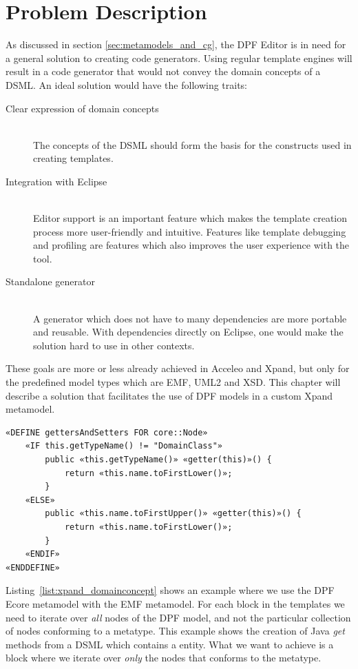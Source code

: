 \section{Problem Description}\label{sec:problem_description}
As discussed in section \ref{sec:metamodels_and_cg}, the DPF Editor is in need for a general solution to creating code generators. Using regular template engines will result in a code generator that would not convey the domain concepts of a DSML. An ideal solution would have the following traits:
\begin{description}
  \item[Clear expression of domain concepts] \hfill \\
  The concepts of the DSML should form the basis for the constructs used in creating templates.
  \item[Integration with Eclipse] \hfill \\
  Editor support is an important feature which makes the template creation process more user-friendly and intuitive. Features like template debugging and profiling are features which also improves the user experience with the tool.
  \item[Standalone generator] \hfill \\
  A generator which does not have to many dependencies are more portable and reusable. With dependencies directly on Eclipse, one would make the solution hard to use in other contexts.
\end{description}

These goals are more or less already achieved in Acceleo and Xpand, but only for the predefined model types which are EMF, UML2 and XSD. This chapter will describe a solution that facilitates the use of DPF models in a custom Xpand metamodel.

\lstset{caption=An example of a Xpand template using the DPF Ecore metamodel as basis.,label=list:xpand_domainconcept,captionpos=b}
\begin{table}[ht]
  \centering
\begin{lstlisting}[showstringspaces=false]
«DEFINE gettersAndSetters FOR core::Node»
	«IF this.getTypeName() != "DomainClass"»
		public «this.getTypeName()» «getter(this)»() {
			return «this.name.toFirstLower()»;
		}
	«ELSE»
		public «this.name.toFirstUpper()» «getter(this)»() {
			return «this.name.toFirstLower()»;
		}
	«ENDIF»
«ENDDEFINE»
\end{lstlisting}
\end{table}

Listing~\ref{list:xpand_domainconcept} shows an example where we use the DPF Ecore metamodel with the EMF metamodel. For each  block in the templates we need to iterate over \emph{all} nodes of the DPF model, and not the particular collection of nodes conforming to a metatype. This example shows the creation of Java \emph{get} methods from a DSML which contains a  entity. What we want to achieve is a  block where we iterate over \emph{only} the nodes that conforms to the  metatype.

